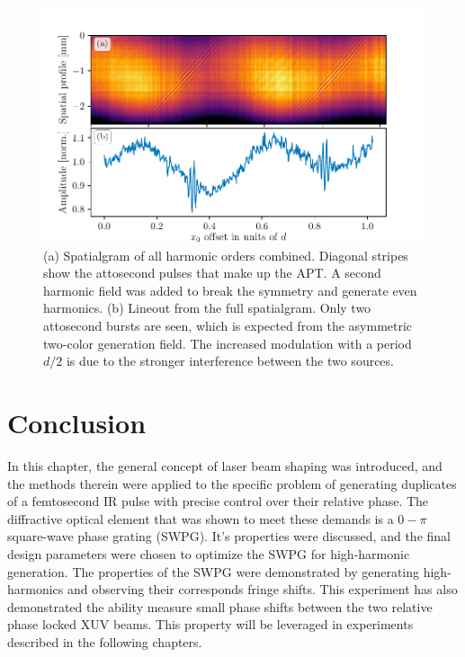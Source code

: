 \begin{figure}
	\centering
	\includegraphics[width=1.0\textwidth]{figures/Two_source/full_spatialgram_w2w.pdf}
	\caption[Spatialgram of all harmonic orders combined when generated using two-color HHG]{(a) Spatialgram of all harmonic orders combined. Diagonal stripes show the attosecond pulses that make up the APT. A second harmonic field was added to break the symmetry and generate even harmonics. (b) Lineout from the full spatialgram.  Only two attosecond bursts are seen, which is expected from the asymmetric two-color generation field.  The increased modulation with a period $d/2$ is due to the stronger interference between the two sources.}
	\label{fig:full_spatialgram_w2w}
\end{figure}

\section{Conclusion}
In this chapter, the general concept of laser beam shaping was introduced, and the methods therein were applied to the specific problem of generating duplicates of a femtosecond IR pulse with precise control over their relative phase. The diffractive optical element that was shown to meet these demands is a $0-\pi$ square-wave phase grating (SWPG).  It's properties were discussed, and the final design parameters were chosen to optimize the SWPG for high-harmonic generation.  The properties of the SWPG were demonstrated by  generating high-harmonics and observing their corresponds fringe shifts.  This experiment has also demonstrated the ability measure small phase shifts between the two relative phase locked XUV beams.  This property will be leveraged in experiments described in the following chapters.

